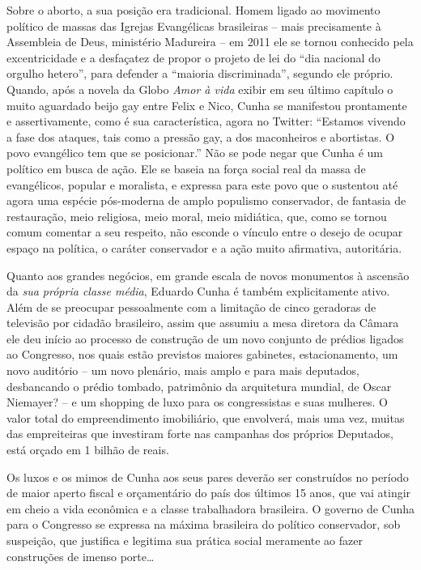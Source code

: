 Sobre o aborto, a sua posição era tradicional. Homem ligado ao movimento
político de massas das Igrejas Evangélicas brasileiras -- mais
precisamente à Assembleia de Deus, ministério Madureira -- em 2011 ele
se tornou conhecido pela excentricidade e a desfaçatez de propor o
projeto de lei do ``dia nacional do orgulho hetero'', para defender a
``maioria discriminada'', segundo ele próprio. Quando, após a novela da
Globo \emph{Amor à vida} exibir em seu último capítulo o muito aguardado
beijo gay entre Felix e Nico, Cunha se manifestou prontamente e
assertivamente, como é sua característica, agora no Twitter: ``Estamos
vivendo a fase dos ataques, tais como a pressão gay, a dos maconheiros e
abortistas. O povo evangélico tem que se posicionar.'' Não se pode negar
que Cunha é um político em busca de ação. Ele se baseia na força social
real da massa de evangélicos, popular e moralista, e expressa para este
povo que o sustentou até agora uma espécie pós-moderna de amplo
populismo conservador, de fantasia de restauração, meio religiosa, meio
moral, meio midiática, que, como se tornou comum comentar a seu
respeito, não esconde o vínculo entre o desejo de ocupar espaço na
política, o caráter conservador e a ação muito afirmativa, autoritária.

Quanto aos grandes negócios, em grande escala de novos monumentos à
ascensão da \emph{sua própria classe média}, Eduardo Cunha é também
explicitamente ativo. Além de se preocupar pessoalmente com a limitação
de cinco geradoras de televisão por cidadão brasileiro, assim que
assumiu a mesa diretora da Câmara ele deu início ao processo de
construção de um novo conjunto de prédios ligados ao Congresso, nos
quais estão previstos maiores gabinetes, estacionamento, um novo
auditório -- um novo plenário, mais amplo e para mais deputados,
desbancando o prédio tombado, patrimônio da arquitetura mundial, de
Oscar Niemayer? -- e um shopping de luxo para os congressistas e suas
mulheres. O valor total do empreendimento imobiliário, que envolverá,
mais uma vez, muitas das empreiteiras que investiram forte nas campanhas
dos próprios Deputados, está orçado em 1 bilhão de reais.

Os luxos e os mimos de Cunha aos seus pares deverão ser construídos no
período de maior aperto fiscal e orçamentário do país dos últimos 15
anos, que vai atingir em cheio a vida econômica e a classe trabalhadora
brasileira. O governo de Cunha para o Congresso se expressa na máxima
brasileira do político conservador, sob suspeição, que justifica e
legitima sua prática social meramente ao fazer construções de imenso
porte…

